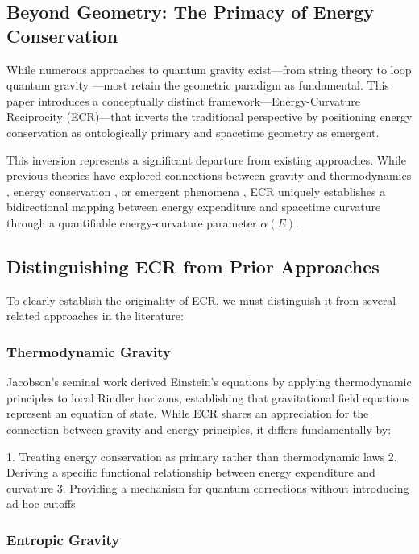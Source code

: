 \documentclass[11pt,a4paper]{article}
\begin{document}
\subsection{Beyond Geometry: The Primacy of Energy Conservation}

While numerous approaches to quantum gravity exist—from string theory \cite{polchinski1998} to loop quantum gravity \cite{rovelli2004}—most retain the geometric paradigm as fundamental. This paper introduces a conceptually distinct framework—Energy-Curvature Reciprocity (ECR)—that inverts the traditional perspective by positioning energy conservation as ontologically primary and spacetime geometry as emergent.

This inversion represents a significant departure from existing approaches. While previous theories have explored connections between gravity and thermodynamics \cite{jacobson1995, verlinde2011, padmanabhan2010}, energy conservation \cite{visser1993}, or emergent phenomena \cite{hu2009}, ECR uniquely establishes a bidirectional mapping between energy expenditure and spacetime curvature through a quantifiable energy-curvature parameter $\alpha(E)$.

\subsection{Distinguishing ECR from Prior Approaches}

To clearly establish the originality of ECR, we must distinguish it from several related approaches in the literature:

\subsubsection{Thermodynamic Gravity}

Jacobson's seminal work \cite{jacobson1995} derived Einstein's equations by applying thermodynamic principles to local Rindler horizons, establishing that gravitational field equations represent an equation of state. While ECR shares an appreciation for the connection between gravity and energy principles, it differs fundamentally by:

1. Treating energy conservation as primary rather than thermodynamic laws
2. Deriving a specific functional relationship between energy expenditure and curvature
3. Providing a mechanism for quantum corrections without introducing ad hoc cutoffs

\subsubsection{Entropic Gravity}
\end{document}
